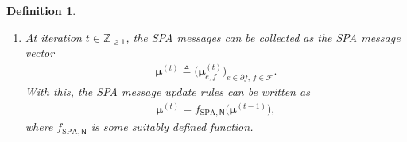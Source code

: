 \documentclass[journal]{IEEEtran}
\newcommand{\add}[1]{{\color{black}#1}}
\newtheorem{definition}[theorem]{Definition}
\newcommand{\vect}[1]{ \bm{#1} }
\newcommand{\set}[1]{\mathcal{#1}}
\newcommand{\beli}{\beta}
\newcommand{\vbeli}{ \vect{\beli} }
\newcommand{\setEfull}{ \mathcal{E} }
\newcommand{\setF}{ \mathcal{F} }
\newcommand{\setpf}{ \partial f }
\newcommand{\vmu}{ \vect{ \mu } }
\newcommand{\defeq}{ \triangleq }
\newcommand{\sZpp}{ \mathbb{Z}_{\geq 1} }
\newcommand{\etof}{ e,f }
\newcommand{\fSPAN}{ f_{\mathrm{SPA},\mathsf{N}} }
\newcommand{\efi}{ e,f_i }
\newcommand{\efj}{ e,f_j }
\newcommand{\setpfi}{ \partial f_{i} }
\newcommand{\setpfj}{ \partial f_{j} }
\begin{document}
\begin{definition}
\begin{enumerate}
\begin{enumerate}
            \item If an edge $ e = (f_{i},f_{j}) \in \setEfull $ satisfies
                  $ \kappa_{\efi}^{(t)} \cdot \kappa_{\efj}^{(t)} \cdot
                    \kappa_e^{(t)} \cdot \kappa_{f_{i}}^{(t)} \cdot
                    \kappa_{f_{j}}^{(t)} = 0 $, then we skip the update
                  procedures of Steps~\ref{SPA: update message},~\ref{SPA:
                    update belief edges}, and~\ref{SPA: update belief
                    functions} for the vectors in
                  $ \{ \vmu_{e_{1},f_{i}}^{(t)}, \vmu_{e_{2},f_{j}}^{(t)}
                    \}_{e_{1} \in \setpfi, e_{2} \in \setpfj} $, the vector
                  $\vbeli_{e}^{(t)}$, and the vectors in
                  $\{\vbeli_{f_{i}}^{(t)},\vbeli_{f_{j}}^{(t)}\}$,
                  respectively.  Instead, for each $ e_{1} \in \setpfi $ and
                  each $ e_{2} \in \setpfj $, we randomly generate the vectors
                  $ \vmu_{e_{1},f_{i}}^{(t)}$ and $ \vmu_{e_{2},f_{j}}^{(t)}$
                  uniformly from $ \set{P}_{\set{X}_{e_1}} $ and
                  $ \set{P}_{\set{X}_{e_2}} $, respectively.  Similarly, we
                  randomly generate $\vbeli_{e}^{(t)}$,
                  $\vbeli_{f_{i}}^{(t)}$, and $\vbeli_{f_{j}}^{(t)}$ uniformly
                  from $ \set{P}_{\set{X}_{e}} $,
                  $ \set{P}_{\set{X}_{\setpfi}} $, and
                  $ \set{P}_{\set{X}_{\setpfj}} $,
                  respectively.\footnote{\add{When a scaling factor vanishes,
                      the normalized update is undefined, and the affected
                      message and belief vectors must be re-initialized. Any
                      strictly positive vector whose components sum to one is
                      a valid replacement, and a uniform draw from the
                      corresponding probability simplex has this property with
                      probability one. We use random draws rather than the
                      fixed uniform vector, so that repeated runs explore
                      different initial conditions and may reveal distinct SPA
                      fixed points.}}
          \end{enumerate}

    \item At iteration $t \in \sZpp$, the SPA messages can be collected as the SPA message vector
          \begin{align*}
            \vmu^{(t)} \defeq
            \bigl( \vmu_{\etof}^{(t)} \bigr)_{ \! e \in \setpf,\, f \in \setF}.
          \end{align*}
          With this, the SPA message update rules can be written as
          \begin{align*}
            \vmu^{(t)} = \fSPAN\bigl( \vmu^{(t-1)} \bigr),
          \end{align*}
          where $\fSPAN$ is some suitably defined function.


\end{enumerate}
\end{definition}
\end{document}
